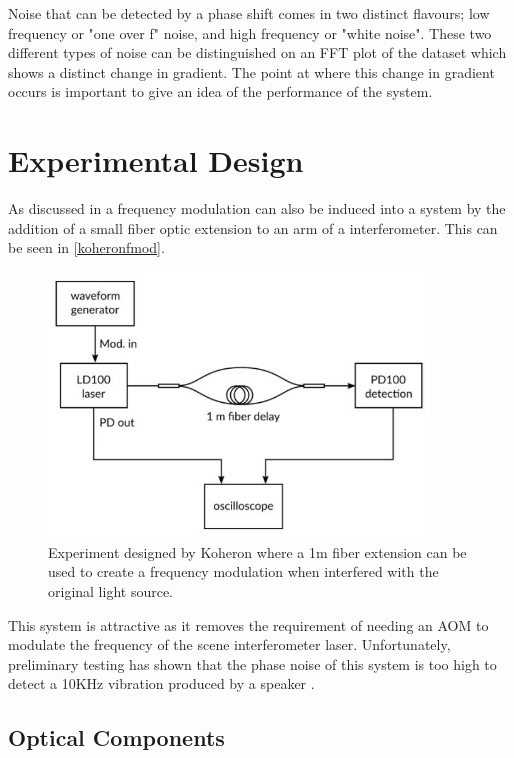 \documentclass[12pt,a4paper,oneside]{report}
\begin{document}
Noise that can be detected by a phase shift comes in two distinct flavours; low frequency or "one over f" noise, and high frequency or "white noise". These two different types of noise can be distinguished on an FFT plot of the dataset which shows a distinct change in gradient. The point at where this change in gradient occurs is important to give an idea of the performance of the system.

\section{Experimental Design}


As discussed in \cite{KoheronAmplitudeKoheron} a frequency modulation can also be induced into a system by the addition of a small fiber optic extension to an arm of a interferometer. This can be seen in \autoref{koheronfmod}.

\begin{figure}[H]
\includegraphics[width=0.9\textwidth, center,angle=0]{DImages/koheronfmod.JPG}
\caption{Experiment designed by Koheron where a 1m fiber extension can be used to create a frequency modulation when interfered with the original light source.}
\label{koheronfmod}
\end{figure}

This system is attractive as it removes the requirement of needing an AOM to modulate the frequency of the scene interferometer laser. Unfortunately, preliminary testing has shown that the phase noise of this system is too high to detect a 10KHz vibration produced by a speaker \cite{Hickling2017InvestigationMAST-U}.

\subsection{Optical Components}
\end{document}
